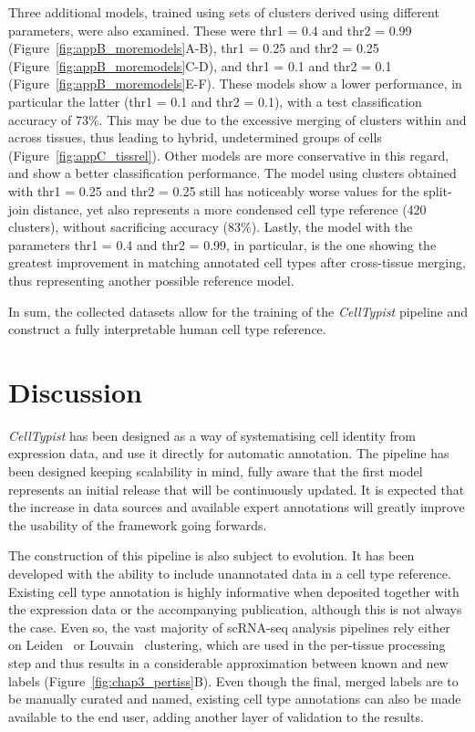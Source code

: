 Three additional models, trained using sets of clusters derived using different parameters, were also examined. These were thr1 = 0.4 and thr2 = 0.99 (Figure~\ref{fig:appB_moremodels}A-B), thr1 = 0.25 and thr2 = 0.25 (Figure~\ref{fig:appB_moremodels}C-D), and thr1 = 0.1 and thr2 = 0.1 (Figure~\ref{fig:appB_moremodels}E-F). These models show a lower performance, in particular the latter (thr1 = 0.1 and thr2 = 0.1), with a test classification accuracy of 73\%. This may be due to the excessive merging of clusters within and across tissues, thus leading to hybrid, undetermined groups of cells (Figure~\ref{fig:appC_tissrel}). Other models are more conservative in this regard, and show a better classification performance. The model using clusters obtained with thr1 = 0.25 and thr2 = 0.25 still has noticeably worse values for the split-join distance, yet also represents a more condensed cell type reference (420 clusters), without sacrificing accuracy (83\%). Lastly, the model with the parameters thr1 = 0.4 and thr2 = 0.99, in particular, is the one showing the greatest improvement in matching annotated cell types after cross-tissue merging, thus representing another possible reference model.

In sum, the collected datasets allow for the training of the \textit{CellTypist} pipeline and construct a fully interpretable human cell type reference.


\section{Discussion}
\label{section3.5}
\textit{CellTypist} has been designed as a way of systematising cell identity from expression data, and use it directly for automatic annotation. The pipeline has been designed keeping scalability in mind, fully aware that the first model represents an initial release that will be continuously updated. It is expected that the increase in data sources and available expert annotations will greatly improve the usability of the framework going forwards.

The construction of this pipeline is also subject to evolution. It has been developed with the ability to include unannotated data in a cell type reference. Existing cell type annotation is highly informative when deposited together with the expression data or the accompanying publication, although this is not always the case. Even so, the vast majority of scRNA-seq analysis pipelines rely either on Leiden~\citep{traag_louvain_2019} or Louvain~\citep{blondel_fast_2008} clustering, which are used in the per-tissue processing step and thus results in a considerable approximation between known and new labels (Figure~\ref{fig:chap3_pertiss}B). Even though the final, merged labels are to be manually curated and named, existing cell type annotations can also be made available to the end user, adding another layer of validation to the results.

